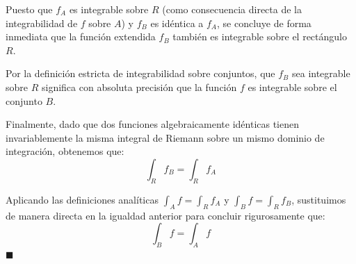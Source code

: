 \documentclass[11pt,letterpaper]{article}
\begin{document}
Puesto que $f_A$ es integrable sobre $R$ (como consecuencia directa de la integrabilidad de $f$ sobre $A$) y $f_B$ es idéntica a $f_A$, se concluye de forma inmediata que la función extendida $f_B$ también es integrable sobre el rectángulo $R$. 

Por la definición estricta de integrabilidad sobre conjuntos, que $f_B$ sea integrable sobre $R$ significa con absoluta precisión que la función $f$ es integrable sobre el conjunto $B$.

Finalmente, dado que dos funciones algebraicamente idénticas tienen invariablemente la misma integral de Riemann sobre un mismo dominio de integración, obtenemos que:
\begin{equation*}
\int_R f_B = \int_R f_A
\end{equation*}

Aplicando las definiciones analíticas $\int_A f = \int_R f_A$ y $\int_B f = \int_R f_B$, sustituimos de manera directa en la igualdad anterior para concluir rigurosamente que:
\begin{equation*}
\int_B f = \int_A f
\end{equation*}
\hfill $\blacksquare$
\end{document}
